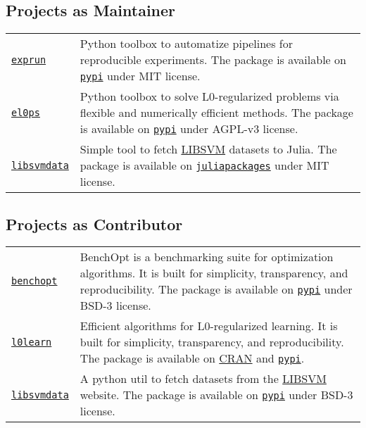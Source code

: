 \subsection*{Projects as Maintainer}
\label{tools:projects-as-maintainer}

\begin{longtable}[l]{@{}p{}p{}}
    \href{https://github.com/TheoGuyard/ExpFlow/tree/main}{\texttt{exprun}} & Python toolbox to automatize pipelines for reproducible experiments. The package is available on \href{https://pypi.org/project/exprun/}{\texttt{pypi}} under MIT license.\\
    \href{https://github.com/TheoGuyard/El0ps/tree/main}{\texttt{el0ps}} & Python toolbox to solve L0-regularized problems via flexible and numerically efficient methods. The package is available on \href{https://pypi.org/project/el0ps/}{\texttt{pypi}} under AGPL-v3 license. \\
    \href{https://github.com/TheoGuyard/LIBSVMdata.jl}{\texttt{libsvmdata}} & Simple tool to fetch \href{https://www.csie.ntu.edu.tw/~cjlin/libsvmtools/datasets/}{LIBSVM} datasets to Julia. The package is available on \href{https://juliapackages.com/packages/libsvmdata}{\texttt{juliapackages}} under MIT license. \\
\end{longtable}

\subsection*{Projects as Contributor}
\label{tools:projects-as-contributor}

\begin{longtable}[l]{@{}p{}p{}}
    \href{https://github.com/benchopt/benchopt}{\texttt{benchopt}} & BenchOpt is a benchmarking suite for optimization algorithms. It is built for simplicity, transparency, and reproducibility. The package is available on \href{https://pypi.org/project/benchopt/}{\texttt{pypi}} under BSD-3 license. \\
    \href{https://github.com/hazimehh/L0Learn}{\texttt{l0learn}} & Efficient algorithms for L0-regularized learning. It is built for simplicity, transparency, and reproducibility. The package is available on \href{https://cran.r-project.org/web/packages/L0Learn/index.html}{CRAN} and \href{https://pypi.org/project/l0learn/}{\texttt{pypi}}. \\
    \href{https://github.com/mathurinm/libsvmdata}{\texttt{libsvmdata}} & A python util to fetch datasets from the \href{https://www.csie.ntu.edu.tw/~cjlin/libsvmtools/datasets/}{LIBSVM} website. The package is available on \href{https://pypi.org/project/libsvmdata/}{\texttt{pypi}} under BSD-3 license. \\
\end{longtable}

